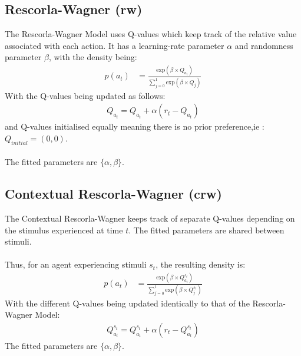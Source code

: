 \documentclass[12pt]{article}
\begin{document}
\subsection{Rescorla-Wagner (rw)}
The Rescorla-Wagner Model uses Q-values which keep track of the relative value associated with each action. It has a learning-rate parameter $\alpha$ and randomness parameter $\beta$, with the density being:
\begin{align}
	p(a_t) &= \frac{\text{exp}\left(\beta \times Q_{a_t}\right)}{\sum_{j=0}^1 \text{exp}\left(\beta \times Q_j\right)}
\end{align}
With the Q-values being updated as follows:
\begin{align}
	Q_{a_t} = Q_{a_t} + \alpha \left(r_t - Q_{a_t}\right) 
\end{align}
and Q-values initialised equally meaning there is no prior preference,ie : $Q_{initial} = (0,0)$.\\\\
The fitted parameters are $\{\alpha, \beta\}$.

\subsection{Contextual Rescorla-Wagner (crw)}
The Contextual Rescorla-Wagner keeps track of separate Q-values depending on the stimulus experienced at time $t$. The fitted parameters are shared between stimuli.\\\\
Thus, for an agent experiencing stimuli $s_t$, the resulting density is:
\begin{align}
	p(a_t) &= \frac{\text{exp}\left(\beta \times Q^{s_t}_{a_t}\right)}{\sum_{j=0}^1 \text{exp}\left(\beta \times Q^{s_t}_j\right)}
\end{align}
With the different Q-values being updated identically to that of the Rescorla-Wagner Model:
\begin{align}
	Q^{s_t}_{a_t} = Q^{s_t}_{a_t} + \alpha \left(r_t - Q^{s_t}_{a_t}\right) 
\end{align}
The fitted parameters are $\{\alpha, \beta\}$.
\end{document}

